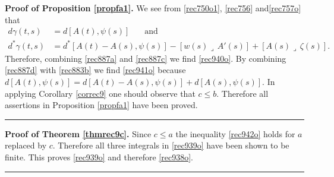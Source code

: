 \documentclass[12pt]{article}
\newenvironment{proof}[1][Proof]{\textbf{#1.} }{\ \rule{0.5em}{0.5em}}
\def \eref{\eqref}
\def \lrc{\lrcorner\,}
\numberwithin{equation}{section}
\begin{document}
\bigskip
\noindent
\begin{proof}[Proof of Proposition \ref{propfa1}] We see from  
\eref{rec750o1}, \eref{rec756}  and\eref{rec757o} that 
\begin{align}
d\gamma(t,s) &=     d[A(t), \psi(s)] \ \ \ \ \    \ \ \ \text{and} \\
d^*\gamma(t,s) &= d^*[A(t) - A(s), \psi(s)]                                
 - [w(s)\lrc A'(s)]  +[ A(s)\lrc  \zeta(s) ].
\end{align}
Therefore, combining 
 \eref{rec887a} and \eref{rec887c} we find \eref{rec940o}.
By combining \eref{rec887d} with \eref{rec883b} we find \eref{rec941o} because 
$d[A(t), \psi(s)] = d[A(t) -A(s), \psi(s)] + d[A(s),\psi(s)]$.
In applying Corollary \ref{correc9} one should observe that $c \le b$.
Therefore all assertions in Proposition \ref{propfa1} have been proved.
\end{proof}



 
 
\bigskip
\noindent
\begin{proof}[Proof of Theorem \ref{thmrec9c}]  
 Since $c \le a$  the inequality
\eref{rec942o} holds for $a$ replaced by $c$. Therefore all three integrals in \eref{rec939o} have been
 shown to be finite. This proves \eref{rec939o} and therefore \eref{rec938o}. 
\end{proof}
\end{document}
